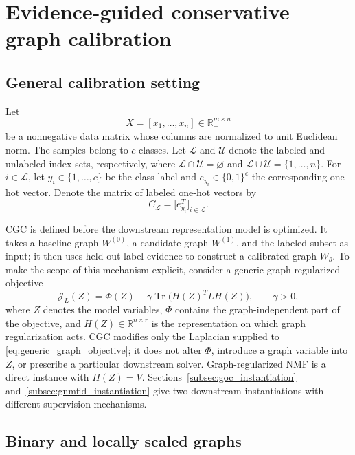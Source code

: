 \documentclass[11pt]{article}
\theoremstyle{remark}
\newcommand{\R}{\mathbb{R}}
\newcommand{\Tr}{\operatorname{Tr}}
\begin{document}
\section{Evidence-guided conservative graph calibration}
\label{sec:method}

\subsection{General calibration setting}

Let
\[
X=[x_1,\ldots,x_n]\in\R_{+}^{m\times n}
\]
be a nonnegative data matrix whose columns are normalized to unit Euclidean norm. The samples belong to $c$ classes. Let $\mathcal L$ and $\mathcal U$ denote the labeled and unlabeled index sets, respectively, where $\mathcal L\cap\mathcal U=\varnothing$ and $\mathcal L\cup\mathcal U=\{1,\ldots,n\}$. For $i\in\mathcal L$, let $y_i\in\{1,\ldots,c\}$ be the class label and $e_{y_i}\in\{0,1\}^{c}$ the corresponding one-hot vector. Denote the matrix of labeled one-hot vectors by
\[
C_{\mathcal L}=\bigl[e_{y_i}^{T}\bigr]_{i\in\mathcal L}.
\]

CGC is defined before the downstream representation model is optimized. It takes a baseline graph $W^{(0)}$, a candidate graph $W^{(1)}$, and the labeled subset as input; it then uses held-out label evidence to construct a calibrated graph $W_\theta$. To make the scope of this mechanism explicit, consider a generic graph-regularized objective
\begin{equation}
\label{eq:generic_graph_objective}
\mathcal J_L(Z)
=
\Phi(Z)
+
\gamma\Tr\!\bigl(H(Z)^T L H(Z)\bigr),
\qquad \gamma>0,
\end{equation}
where $Z$ denotes the model variables, $\Phi$ contains the graph-independent part of the objective, and $H(Z)\in\R^{n\times r}$ is the representation on which graph regularization acts. CGC modifies only the Laplacian supplied to \eqref{eq:generic_graph_objective}; it does not alter $\Phi$, introduce a graph variable into $Z$, or prescribe a particular downstream solver. Graph-regularized NMF is a direct instance with $H(Z)=V$. Sections~\ref{subsec:goc_instantiation} and~\ref{subsec:gnmfld_instantiation} give two downstream instantiations with different supervision mechanisms.

\subsection{Binary and locally scaled graphs}
\end{document}
